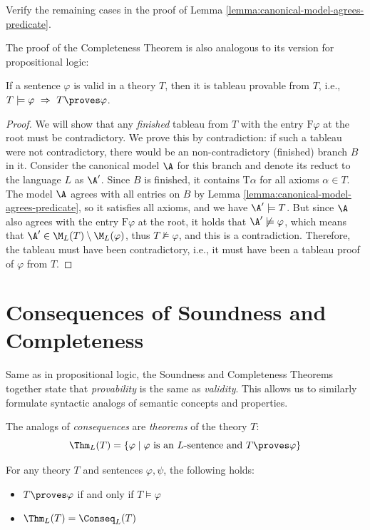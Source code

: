 \begin{exercise}
    Verify the remaining cases in the proof of Lemma \ref{lemma:canonical-model-agrees-predicate}.
\end{exercise}

The proof of the Completeness Theorem is also analogous to its version for propositional logic:

\begin{theorem}[On Completeness]\label{theorem:completeness-theorem-predicate}
    If a sentence $\varphi$ is valid in a theory $T$, then it is tableau provable from $T$, i.e., $T\models\varphi\ \Rightarrow\ T\proves\varphi$.    
\end{theorem} 

\begin{proof}
We will show that any \emph{finished} tableau from $T$ with the entry $\mathrm{F}\varphi$ at the root must be contradictory. We prove this by contradiction: if such a tableau were not contradictory, there would be an non-contradictory (finished) branch $B$ in it. Consider the canonical model $\A$ for this branch and denote its reduct to the language $L$ as $\A'$. Since $B$ is finished, it contains $\mathrm{T}\alpha$ for all axioms $\alpha\in T$. The model $\A$ agrees with all entries on $B$ by Lemma \ref{lemma:canonical-model-agrees-predicate}, so it satisfies all axioms, and we have $\A'\models T$. But since $\A$ also agrees with the entry $\mathrm{F}\varphi$ at the root, it holds that $\A'\not\models\varphi$, which means that $\A'\in \M_L(T)\setminus\M_L(\varphi)$, thus $T\not\models\varphi$, and this is a contradiction. Therefore, the tableau must have been contradictory, i.e., it must have been a tableau proof of $\varphi$ from $T$.
\end{proof}


\section{Consequences of Soundness and Completeness}

Same as in propositional logic, the Soundness and Completeness Theorems together state that \emph{provability} is the same as \emph{validity}. This allows us to similarly formulate syntactic analogs of semantic concepts and properties.

The analogs of \emph{consequences} are \emph{theorems} of the theory $T$:
$$
\Thm_L(T)=\{\varphi\mid \varphi\text{ is an $L$-sentence and } T\proves\varphi\}
$$

\begin{corollary}[Provability = Validity]\label{corollary:corollary-of-soundness-and-completeness-predicate}
    For any theory $T$ and sentences $\varphi,\psi$, the following holds:
    \begin{itemize}
        \item $T\proves\varphi$ if and only if $T\models\varphi$
        \item $\Thm_L(T)=\Conseq_L(T)$
    \end{itemize}
\end{corollary}

